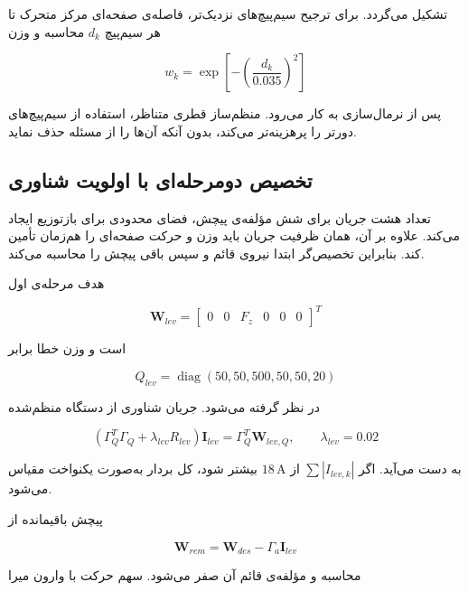 تشکیل می‌گردد. برای ترجیح سیم‌پیچ‌های نزدیک‌تر، فاصله‌ی صفحه‌ای مرکز متحرک تا هر سیم‌پیچ $d_k$ محاسبه و وزن

\begin{equation}
	w_k=\exp\left[-\left(\frac{d_k}{0.035}\right)^2\right]
	\label{eq:method-proximity-weight}
\end{equation}

پس از نرمال‌سازی به کار می‌رود. منظم‌ساز قطری متناظر، استفاده از سیم‌پیچ‌های دورتر را پرهزینه‌تر می‌کند، بدون آنکه آن‌ها را از مسئله حذف نماید.

\subsection{تخصیص دومرحله‌ای با اولویت شناوری}

تعداد هشت جریان برای شش مؤلفه‌ی پیچش، فضای محدودی برای بازتوزیع ایجاد می‌کند. علاوه بر آن، همان ظرفیت جریان باید وزن و حرکت صفحه‌ای را هم‌زمان تأمین کند. بنابراین تخصیص‌گر ابتدا نیروی قائم و سپس باقی پیچش را محاسبه می‌کند.

هدف مرحله‌ی اول

\begin{equation}
	\mathbf W_{lev}=\begin{bmatrix}0&0&F_z&0&0&0\end{bmatrix}^{T}
\end{equation}

است و وزن خطا برابر

\begin{equation}
	Q_{lev}=\operatorname{diag}(50,50,500,50,50,20)
\end{equation}

در نظر گرفته می‌شود. جریان شناوری از دستگاه منظم‌شده

\begin{equation}
	(\Gamma_Q^T\Gamma_Q+\lambda_{lev}R_{lev})\mathbf I_{lev}
	=\Gamma_Q^T\mathbf W_{lev,Q},
	\qquad \lambda_{lev}=0.02
	\label{eq:method-levitation-allocation}
\end{equation}

به دست می‌آید. اگر $\sum|I_{lev,k}|$ از $18\,\mathrm A$ بیشتر شود، کل بردار به‌صورت یکنواخت مقیاس می‌شود.

پیچش باقیمانده از

\begin{equation}
	\mathbf W_{rem}=\mathbf W_{des}-\Gamma_a\mathbf I_{lev}
\end{equation}

محاسبه و مؤلفه‌ی قائم آن صفر می‌شود. سهم حرکت با وارون میرا

